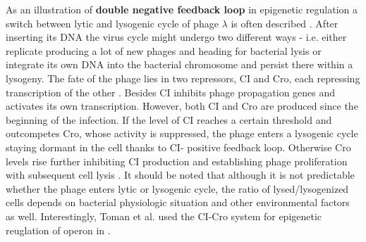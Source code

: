 As an illustration of \textbf{double negative feedback loop} in epigenetic regulation a switch between lytic and lysogenic cycle of  phage $\lambda$ is often described \cite{smits2006phenotypic, casadesus2013programmed}.
After inserting its DNA the virus cycle might undergo two different ways - i.e. either replicate producing a lot of new phages and heading for bacterial lysis or integrate its own DNA into the bacterial chromosome and persist there within a lysogeny.
The fate of the phage lies in two repressors, CI and Cro, each repressing transcription of the other \cite{eisen1970regulation, neubauer1970immunity}.
Besides CI inhibits phage propagation genes and activates its own transcription.
However, both CI and Cro are produced since the beginning of the infection.
If the level of CI reaches a certain threshold and outcompetes Cro, whose activity is suppressed, the phage enters a lysogenic cycle staying dormant in the cell thanks to CI- positive feedback loop.
Otherwise Cro levels rise further inhibiting CI production and establishing phage proliferation with subsequent cell lysis \cite{svenningsen2005role}.
It should be noted that although it is not predictable whether the phage enters lytic or lysogenic cycle, the ratio of lysed/lysogenized cells depends on bacterial physiologic situation and other environmental factors as well.
Interestingly, Toman et al. used the CI-Cro system for epigenetic reuglation of  operon in  \cite{toman1985system}.



